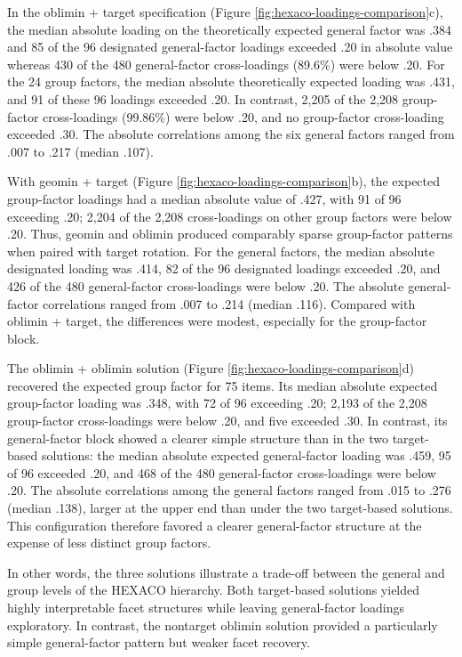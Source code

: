 \documentclass[
  12pt,
  letterpaper,
  article]{scrartcl}
\begin{document}
In the oblimin + target specification (Figure
\ref{fig:hexaco-loadings-comparison}c), the median absolute loading on
the theoretically expected general factor was .384 and 85 of the 96
designated general-factor loadings exceeded .20 in absolute value
whereas 430 of the 480 general-factor cross-loadings (89.6\%) were below
.20. For the 24 group factors, the median absolute theoretically
expected loading was .431, and 91 of these 96 loadings exceeded .20. In
contrast, 2,205 of the 2,208 group-factor cross-loadings (99.86\%) were
below .20, and no group-factor cross-loading exceeded .30. The absolute
correlations among the six general factors ranged from .007 to .217
(median .107).

With geomin + target (Figure \ref{fig:hexaco-loadings-comparison}b), the
expected group-factor loadings had a median absolute value of .427, with
91 of 96 exceeding .20; 2,204 of the 2,208 cross-loadings on other group
factors were below .20. Thus, geomin and oblimin produced comparably
sparse group-factor patterns when paired with target rotation. For the
general factors, the median absolute designated loading was .414, 82 of
the 96 designated loadings exceeded .20, and 426 of the 480
general-factor cross-loadings were below .20. The absolute
general-factor correlations ranged from .007 to .214 (median .116).
Compared with oblimin + target, the differences were modest, especially
for the group-factor block.

The oblimin + oblimin solution (Figure
\ref{fig:hexaco-loadings-comparison}d) recovered the expected group
factor for 75 items. Its median absolute expected group-factor loading
was .348, with 72 of 96 exceeding .20; 2,193 of the 2,208 group-factor
cross-loadings were below .20, and five exceeded .30. In contrast, its
general-factor block showed a clearer simple structure than in the two
target-based solutions: the median absolute expected general-factor
loading was .459, 95 of 96 exceeded .20, and 468 of the 480
general-factor cross-loadings were below .20. The absolute correlations
among the general factors ranged from .015 to .276 (median .138), larger
at the upper end than under the two target-based solutions. This
configuration therefore favored a clearer general-factor structure at
the expense of less distinct group factors.

In other words, the three solutions illustrate a trade-off between the
general and group levels of the HEXACO hierarchy. Both target-based
solutions yielded highly interpretable facet structures while leaving
general-factor loadings exploratory. In contrast, the nontarget oblimin
solution provided a particularly simple general-factor pattern but
weaker facet recovery.
\end{document}
